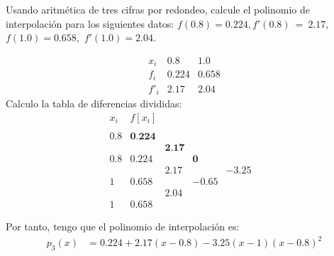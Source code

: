 \documentclass[12pt]{article}
\begin{document}
\begin{ejercicio} 
    Usando aritmética de tres cifras por redondeo, calcule el polinomio de interpolación para los siguientes datos: $f(0.8) = 0.224, f'(0.8)~=~2.17,$\\$f(1.0)=0.658,$ $f'(1.0) = 2.04$.

    \begin{equation*}
        \begin{array}{c|cc}
            x_i & 0.8 & 1.0 \\ \hline
            f_i & 0.224 & 0.658 \\ \hline
            f'_i & 2.17 & 2.04
        \end{array}
    \end{equation*}
    Calculo la tabla de diferencias divididas:
    \begin{equation*}
        \begin{array}{c|cccccc}
            x_i & f[x_i] \\
            \\
            0.8 & \textbf{0.224} \\
            && \textbf{2.17}\\
            0.8 & 0.224 && \textbf{0}\\
            && 2.17&&\mathbf{-3.25}\\
            1 & 0.658 && -0.65 &&\\
            && 2.04\\
            1 & 0.658
        \end{array}
    \end{equation*}

    Por tanto, tengo que el polinomio de interpolación es:
    \begin{equation*}
        \begin{split}
            p_3(x)&= 0.224 + 2.17(x-0.8) -3.25(x-1)(x-0.8)^2
        \end{split}
    \end{equation*}
\end{ejercicio}
\end{document}
